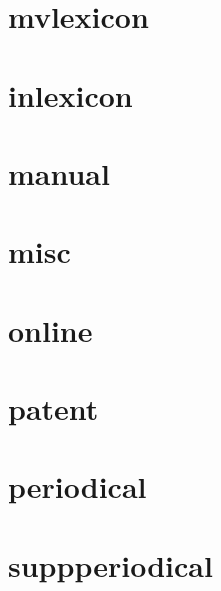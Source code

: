 \documentclass[a4paper]{article}
\begin{document}
\cite[1]{lexicon}

\cite[1]{lexicon}

\section{mvlexicon}

\cite[1]{mvlexicon}

\cite[1]{mvlexicon}

\section{inlexicon}

\cite[1]{inlexicon}

\cite[1]{inlexicon}

\section{manual}

\cite[1]{manual}

\cite[1]{manual}

\section{misc}

\cite[1]{misc}

\cite[1]{misc}

\section{online}

\cite[1]{online}

\cite[1]{online}

\section{patent}

\cite[1]{patent}

\cite[1]{patent}

\section{periodical}

\cite[1]{periodical}

\cite[1]{periodical}

\section{suppperiodical}
\end{document}
